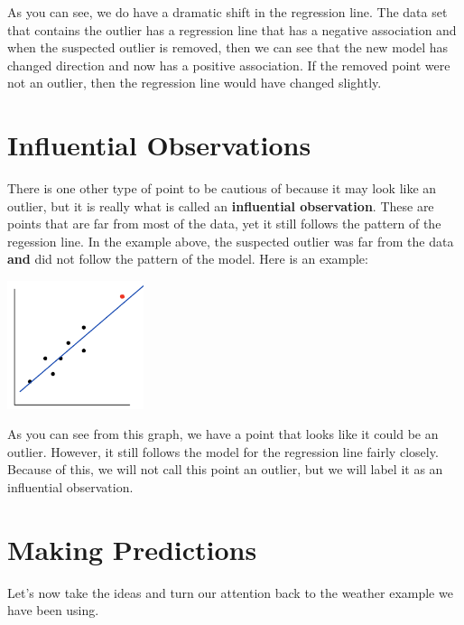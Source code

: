 \documentclass[
  letterpaper,
  DIV=11,
  numbers=noendperiod]{scrreprt}
\begin{document}
As you can see, we do have a dramatic shift in the regression line. The
data set that contains the outlier has a regression line that has a
negative association and when the suspected outlier is removed, then we
can see that the new model has changed direction and now has a positive
association. If the removed point were not an outlier, then the
regression line would have changed slightly.

\section*{Influential Observations}\label{influential-observations}


There is one other type of point to be cautious of because it may look
like an outlier, but it is really what is called an \textbf{influential
observation}. These are points that are far from most of the data, yet
it still follows the pattern of the regession line. In the example
above, the suspected outlier was far from the data \textbf{and} did not
follow the pattern of the model. Here is an example:

\includegraphics[width=0.3\textwidth,height=\textheight]{./images/ROP_7.jpg}

As you can see from this graph, we have a point that looks like it could
be an outlier. However, it still follows the model for the regression
line fairly closely. Because of this, we will not call this point an
outlier, but we will label it as an influential observation.

\section*{Making Predictions}\label{making-predictions}


Let's now take the ideas and turn our attention back to the weather
example we have been using.
\end{document}
